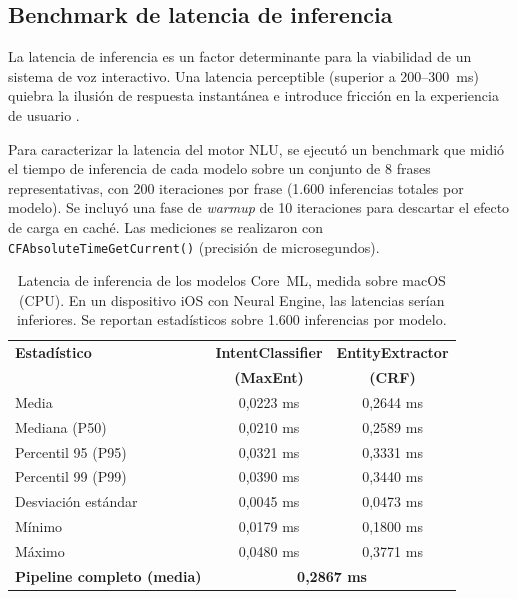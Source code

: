 \subsection{Benchmark de latencia de inferencia}
\label{subsec:latencia}

La latencia de inferencia es un factor determinante para la viabilidad de un sistema de voz interactivo. Una latencia perceptible (superior a 200--300~ms)
quiebra la ilusión de respuesta instantánea e introduce fricción en la experiencia de usuario \citep{nielsen-response-times}.

Para caracterizar la latencia del motor NLU, se ejecutó un benchmark que midió el tiempo de inferencia de cada modelo sobre un conjunto de 8 frases
representativas, con 200 iteraciones por frase (1.600 inferencias totales por modelo). Se incluyó una fase de \textit{warmup} de 10 iteraciones para
descartar el efecto de carga en caché. Las mediciones se realizaron con \texttt{CFAbsoluteTimeGetCurrent()} (precisión de microsegundos).

\begin{table}[H]
\caption{Latencia de inferencia de los modelos Core~ML, medida sobre macOS
         (CPU). En un dispositivo iOS con Neural Engine, las latencias serían
         inferiores. Se reportan estadísticos sobre 1.600 inferencias por modelo.}

\centering
\label{tab:latencia}
\begin{tabular}{@{}lcc@{}}
\toprule
\textbf{Estadístico}
  & \textbf{IntentClassifier}
  & \textbf{EntityExtractor} \\
  & \textbf{(MaxEnt)}
  & \textbf{(CRF)} \\
\midrule
Media               & 0,0223 ms & 0,2644 ms \\
Mediana (P50)       & 0,0210 ms & 0,2589 ms \\
Percentil 95 (P95)  & 0,0321 ms & 0,3331 ms \\
Percentil 99 (P99)  & 0,0390 ms & 0,3440 ms \\
Desviación estándar & 0,0045 ms & 0,0473 ms \\
Mínimo              & 0,0179 ms & 0,1800 ms \\
Máximo              & 0,0480 ms & 0,3771 ms \\
\midrule
\textbf{Pipeline completo (media)} & \multicolumn{2}{c}{\textbf{0,2867 ms}} \\
\bottomrule
\end{tabular}
\end{table}

